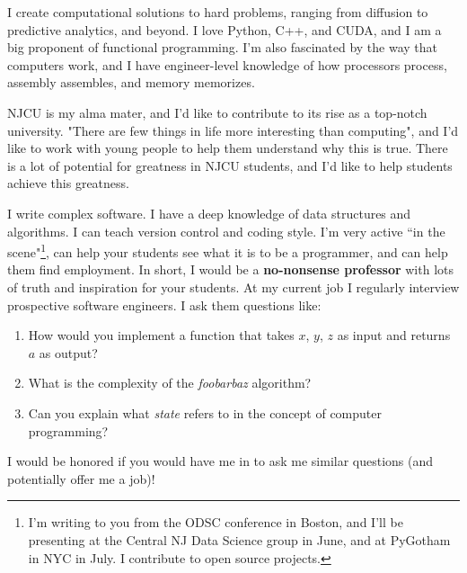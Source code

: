 \documentclass[11pt, a4paper]{awesome-cv}
\begin{document}
\makecvheader

\makelettertitle

\begin{cvletter}
I create computational solutions to hard problems, ranging from diffusion to predictive analytics, and beyond. I love Python, C++, and CUDA, and I am a big proponent of functional programming. I'm also fascinated by the way that computers work, and I have engineer-level knowledge of how processors process, assembly assembles, and memory memorizes.

NJCU is my alma mater, and I'd like to contribute to its rise as a top-notch university. "There are few things in life more interesting than computing", and I'd like to work with young people to help them understand why this is true. There is a lot of potential for greatness in NJCU students, and I'd like to help students achieve this greatness.

I write complex software. I have a deep knowledge of data structures and algorithms. I can teach version control and coding style.  I'm very active ``in the scene"\footnote{I'm writing to you from the ODSC conference in Boston, and I'll be presenting at the Central NJ Data Science group in June, and at PyGotham in NYC in July. I contribute to open source projects.}, can help your students see what it is to be a programmer, and can help them find employment. In short, I would be a \textbf{no-nonsense professor} with lots of truth and inspiration for your students.
At my current job I regularly interview prospective software engineers. I ask them questions like:
\begin{enumerate}
\item How would you implement a function that takes $x$, $y$, $z$ as input and returns $a$ as output?
\item What is the complexity of the \textit{foobarbaz} algorithm?
\item Can you explain what \textit{state} refers to in the concept of computer programming?
\end{enumerate}
I would be honored if you would have me in to ask me similar questions (and potentially offer me a job)!

\end{cvletter}

\makeletterclosing
\end{document}
